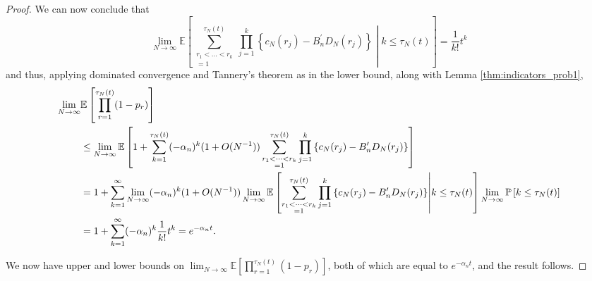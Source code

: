 \documentclass{article}
\newcommand{\Prob}{\mathbb{P}}
\newcommand{\E}{\mathbb{E}}
\newcommand{\1}[1]{\mathbbm{1}_{#1}}
\begin{document}
\begin{proof}
We can now conclude that
\begin{equation}
\lim_{N\to\infty} \E \left[ \sum_{\substack{r_1<\dots<r_k \\ =1}}^{\tau_N(t)}\prod_{j=1}^k 
\left\{ c_N(r_j) - B_n^\prime D_N(r_j) \right\} \middle| k\leq \tau_N(t) \right]
= \frac{1}{k!} t^k
\end{equation}
and thus, applying dominated convergence and Tannery's theorem as in the lower bound, along with Lemma \ref{thm:indicators_prob1},
\begin{align}
\lim_{N\to\infty} &\E\left[ \prod_{r=1}^{\tau_N(t)} (1-p_r) \right] \notag\\
&\leq \lim_{N\to\infty} \E\left[
1 + \sum_{k=1}^{\tau_N(t)} (- \alpha_n)^k (1+O(N^{-1})) \sum_{\substack{r_1<\dots<r_k \\ =1}}^{\tau_N(t)}\prod_{j=1}^k 
\left\{ c_N(r_j) - B_n^\prime D_N(r_j) \right\} \right] \notag\\
&= 1 + \sum_{k=1}^\infty \lim_{N\to\infty} (- \alpha_n)^k (1+O(N^{-1}))
\lim_{N\to\infty} \E \left[ \sum_{\substack{r_1<\dots<r_k \\ =1}}^{\tau_N(t)}\prod_{j=1}^k 
\left\{ c_N(r_j) - B_n^\prime D_N(r_j) \right\} \middle| k\leq \tau_N(t) \right]
\lim_{N\to\infty} \Prob\left[ k\leq \tau_N(t) \right] \notag\\
&= 1+ \sum_{k=1}^\infty (-\alpha_n)^k \frac{1}{k!} t^k
= e^{-\alpha_n t} .
\end{align}

We now have upper and lower bounds on $\lim_{N\to\infty} \E\left[ \prod_{r=1}^{\tau_N(t)} (1-p_r) \right]$, both of which are equal to $e^{-\alpha_n t}$, and the result follows.
\end{proof}
\end{document}
